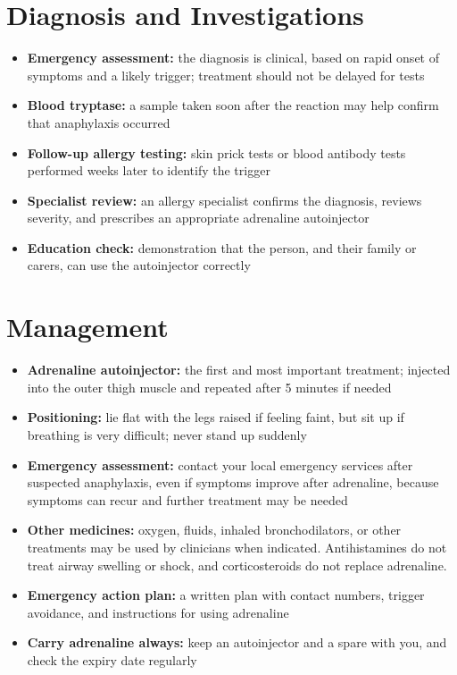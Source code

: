 \section*{Diagnosis and Investigations}
\begin{itemize}
    \item \textbf{Emergency assessment:} the diagnosis is clinical, based on rapid onset of symptoms and a likely trigger; treatment should not be delayed for tests
    \item \textbf{Blood tryptase:} a sample taken soon after the reaction may help confirm that anaphylaxis occurred
    \item \textbf{Follow-up allergy testing:} skin prick tests or blood antibody tests performed weeks later to identify the trigger
    \item \textbf{Specialist review:} an allergy specialist confirms the diagnosis, reviews severity, and prescribes an appropriate adrenaline autoinjector
    \item \textbf{Education check:} demonstration that the person, and their family or carers, can use the autoinjector correctly
\end{itemize}

\section*{Management}
\begin{itemize}
    \item \textbf{Adrenaline autoinjector:} the first and most important treatment; injected into the outer thigh muscle and repeated after 5 minutes if needed
    \item \textbf{Positioning:} lie flat with the legs raised if feeling faint, but sit up if breathing is very difficult; never stand up suddenly
    \item \textbf{Emergency assessment:} contact your local emergency services after suspected anaphylaxis, even if symptoms improve after adrenaline, because symptoms can recur and further treatment may be needed
    \item \textbf{Other medicines:} oxygen, fluids, inhaled bronchodilators, or other treatments may be used by clinicians when indicated. Antihistamines do not treat airway swelling or shock, and corticosteroids do not replace adrenaline.
    \item \textbf{Emergency action plan:} a written plan with contact numbers, trigger avoidance, and instructions for using adrenaline
    \item \textbf{Carry adrenaline always:} keep an autoinjector and a spare with you, and check the expiry date regularly
\end{itemize}


